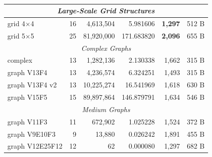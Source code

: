 ﻿﻿\documentclass[12pt,a4paper]{article}
\theoremstyle{definition}
\theoremstyle{remark}
\begin{document}
\begin{table}[htbp]
\begin{tabular}{|l|r|r|r|r|r|}
		\hline
		\multicolumn{6}{|c|}{\textit{Large-Scale Grid Structures}}                                                               \\
		\hline
		grid 4$\times$4    & 16         & 4,613,504               & 5.981606          & \textbf{1,297}     & 512 B               \\
		grid 5$\times$5    & 25         & 81,920,000              & 171.683820        & \textbf{2,096}     & 655 B               \\
		\hline
		\multicolumn{6}{|c|}{\textit{Complex Graphs}}                                                                            \\
		\hline
		complex            & 13         & 1,282,136               & 2.130338          & 1,662              & 315 B               \\
		graph V13F4        & 13         & 4,236,574               & 6.324251          & 1,493              & 315 B               \\
		graph V13F4 v2     & 13         & 10,225,274              & 16.541969         & 1,618              & 630 B               \\
		graph V15F5        & 15         & 89,897,864              & 146.879791        & 1,634              & 546 B               \\
		\hline
		\multicolumn{6}{|c|}{\textit{Medium Graphs}}                                                                             \\
		\hline
		graph V11F3        & 11         & 672,902                 & 1.025228          & 1,524              & 372 B               \\
		graph V9E10F3      & 9          & 13,880                  & 0.026242          & 1,891              & 455 B               \\
		graph V12E25F12    & 12         & 62                      & 0.000080          & 1,297              & 682 B               \\
		\hline
	\end{tabular}
\end{table}
\end{document}

